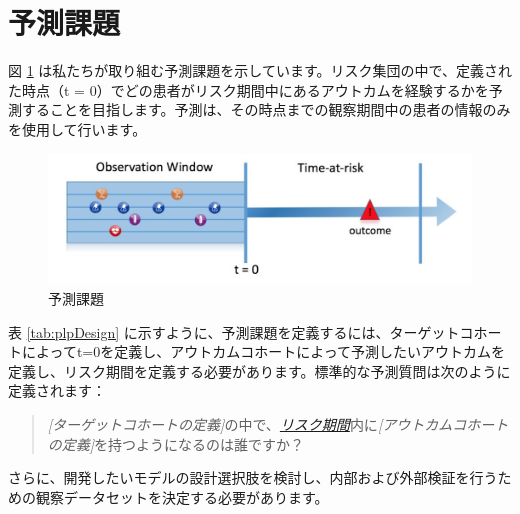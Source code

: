 \documentclass[
  11pt]{book}
\theoremstyle{definition}
\theoremstyle{definition}
\theoremstyle{definition}
\theoremstyle{definition}
\theoremstyle{remark}
\begin{document}
\section{予測課題}\label{ux4e88ux6e2cux8ab2ux984c}

図 \ref{fig:figure1} は私たちが取り組む予測課題を示しています。リスク集団の中で、定義された時点（t = 0）でどの患者がリスク期間中にあるアウトカムを経験するかを予測することを目指します。予測は、その時点までの観察期間中の患者の情報のみを使用して行います。

\begin{figure}
\includegraphics[width=1\linewidth]{images/PatientLevelPrediction/Figure1} \caption{予測課題}\label{fig:figure1}
\end{figure}

表 \ref{tab:plpDesign} に示すように、予測課題を定義するには、ターゲットコホートによってt=0を定義し、アウトカムコホートによって予測したいアウトカムを定義し、リスク期間を定義する必要があります。標準的な予測質問は次のように定義されます：   

\begin{quote}
\emph{{[}ターゲットコホートの定義{]}}の中で、\emph{\hyperref[ux30eaux30b9ux30afux671fux9593]{リスク期間}}内に\emph{{[}アウトカムコホートの定義{]}}を持つようになるのは誰ですか？
\end{quote}

さらに、開発したいモデルの設計選択肢を検討し、内部および外部検証を行うための観察データセットを決定する必要があります。
\end{document}
